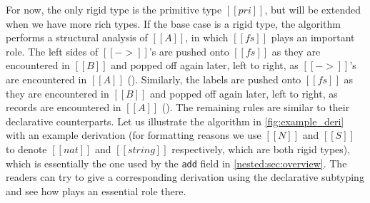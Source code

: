 For now, the only rigid type is the primitive type $[[pri]]$, but will be
extended when we have more rich types. If the base case is a rigid type, the
algorithm performs a structural analysis of $[[A]]$, in which $[[fs]]$ plays an
important role. The left sides of $[[->]]$'s are pushed onto $[[fs]]$ as they
are encountered in $[[B]]$ and popped off again later, left to right, as
$[[->]]$'s are encountered in $[[A]]$ (). Similarly, the labels are
pushed onto $[[fs]]$ as they are encountered in $[[B]]$ and popped off again
later, left to right, as records are encountered in $[[A]]$ (). The
remaining rules are similar to their declarative counterparts. Let us illustrate
the algorithm in \cref{fig:example_deri} with an example derivation (for
formatting reasons we use $[[N]]$ and $[[S]]$ to denote $[[nat]]$ and
$[[string]]$ respectively, which are both rigid types), which is essentially the
one used by the \lstinline{add} field in \cref{nested:sec:overview}. The readers
can try to give a corresponding derivation using the declarative subtyping and
see how  plays an essential role there.


